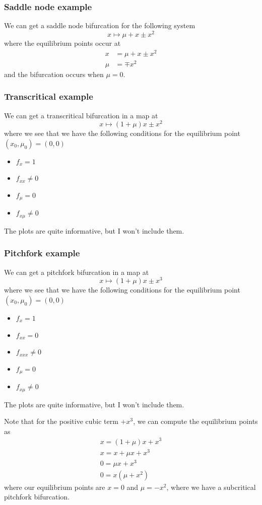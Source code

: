 \documentclass{article}
\begin{document}
\subsubsection{Saddle node example}

We can get a saddle node bifurcation for the following system 
\[
x\mapsto \mu + x \pm x^2
\]
where the equilibrium points occur at
\begin{align*}
    x&= \mu + x \pm x^2\\
    \mu &= \mp x^2
\end{align*}
and the bifurcation occurs when $\mu=0$. 

\subsubsection{Transcritical example}

We can get a transcritical bifurcation in a map at 
\[
x\mapsto \left(1+\mu\right)x\pm x^2
\]
where we see that we have the following conditions for the equilibrium point $(x_0,\mu_0)=(0,0)$
\begin{itemize}
    \item $f_x=1$
    \item $f_{xx}\neq 0$
    \item $f_\mu=0$
    \item $f_{x\mu}\neq 0$
\end{itemize}
The plots are quite informative, but I won't include them.

\subsubsection{Pitchfork example}

We can get a pitchfork bifurcation in a map at 
\[
x\mapsto \left(1+\mu\right)x\pm x^3
\]
where we see that we have the following conditions for the equilibrium point $(x_0,\mu_0)=(0,0)$
\begin{itemize}
    \item $f_x=1$
    \item $f_{xx}=0$
    \item $f_{xxx}\neq 0$
    \item $f_\mu=0$
    \item $f_{x\mu}\neq 0$
\end{itemize}
The plots are quite informative, but I won't include them.

Note that for the positive cubic term $+x^3$, we can compute the equilibrium points as 
\begin{gather*}
    x=\left(1+\mu\right)x + x^3\\
    x= x + \mu x + x^3\\
    0=\mu x + x^3\\
    0=x\left(\mu+x^2\right)
\end{gather*}
where our equilibrium points are $x=0$ and $\mu = - x^2$, where we have a subcritical pitchfork bifurcation.
\end{document}
